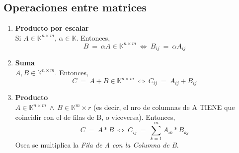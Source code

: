 \documentclass{article}
\newcommand{\lands}{\:\land\:}                          %
\newcommand{\comma}{,\,}                                %
\newcommand{\eq}{\:=\:}                                 %
\newcommand{\cuerpo}{\mathbb{K}}                        %
\newcommand{\Leftrightarrows}{\: \Leftrightarrow \:}    %
\newcommand{\sumatoria}[2]{\sum_{#1} ^{#2}}             %
\begin{document}
\subsection{Operaciones entre matrices}
\begin{enumerate}
    \item \textbf{Producto por escalar}
       \\Si $A \in \cuerpo^{n \times m} \comma \alpha \in \cuerpo$. Entonces,
       \begin{equation*}
           B \eq \alpha A \in \cuerpo^{n \times m} \Leftrightarrows B_{ij} \eq \alpha A_{ij}
       \end{equation*}
    \item \textbf{Suma}
    \\ $A,B \in \cuerpo^{n \times m}$. Entonces,
    \begin{equation*}
        C \eq A + B \in \cuerpo ^{n \times m} \Leftrightarrows C_{ij} \eq A_{ij} + B_{ij}
    \end{equation*}
    \item \textbf{Producto}
    \\$A \in \cuerpo^{n \times m} \lands B \in \cuerpo^m \times r$ (es decir, el nro de columnas de A TIENE que coincidir con el de filas de B, o viceversa). Entonces,
    \begin{equation*}
        C \eq A * B \Leftrightarrows C_{ij} \eq \sumatoria{k=1}{m} A_{ik} * B_{kj}
    \end{equation*}
    Osea se multiplica la \emph{Fila de A con la Columna de B}.
\end{enumerate}
\end{document}
